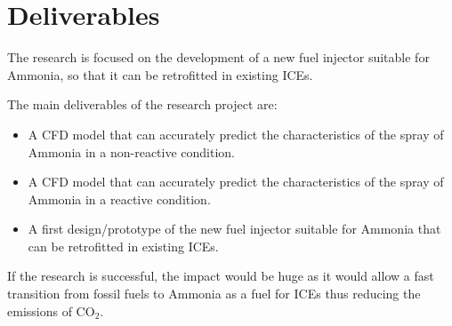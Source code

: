 \section{Deliverables}
\label{sec:deliverables}

The research is focused on the development of a new fuel injector suitable for Ammonia, so that it can be retrofitted in existing ICEs.

The main deliverables of the research project are:

\begin{itemize}
    \item A CFD model that can accurately predict the characteristics of the spray of Ammonia in a non-reactive condition.
    \item A CFD model that can accurately predict the characteristics of the spray of Ammonia in a reactive condition.
    \item A first design/prototype of the new fuel injector suitable for Ammonia that can be retrofitted in existing ICEs.
\end{itemize}

If the research is successful, the impact would be huge as it would allow a fast transition from fossil fuels to Ammonia as a fuel for ICEs thus reducing the emissions of $\mathrm{CO_2}$.


